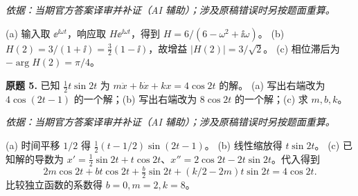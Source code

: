 \begin{solution}
\textit{依据：当期官方答案译审并补证（AI 辅助）；涉及原稿错误时另按题面重算。}\par
(a) 输入取 $\ee^{\ii\omega t}$，响应取 $H\ee^{\ii\omega t}$，得到 $H=6/(6-\omega^2+\ii\omega)$。
(b) $H(2)=3/(1+\ii)=\tfrac32(1-\ii)$，故增益 $|H(2)|=3/\sqrt2$。
(c) 相位滞后为 $-\arg H(2)=\pi/4$。
\end{solution}
\begin{exercise}\label{cw:ex2-5}\textbf{原题 5.} 已知 $\tfrac12t\sin2t$ 为 $m\ddot x+b\dot x+kx=4\cos2t$ 的解。
(a) 写出右端改为 $4\cos(2t-1)$ 的一个解；(b) 写出右端改为 $8\cos2t$ 的一个解；(c) 求 $m,b,k$。
\end{exercise}
\begin{solution}
\textit{依据：当期官方答案译审并补证（AI 辅助）；涉及原稿错误时另按题面重算。}\par
(a) 时间平移 $1/2$ 得 $\tfrac12(t-1/2)\sin(2t-1)$。
(b) 线性缩放得 $t\sin2t$。
(c) 已知解的导数为 $x'=\tfrac12\sin2t+t\cos2t$、$x''=2\cos2t-2t\sin2t$。代入得到
\[2m\cos2t+bt\cos2t+\tfrac b2\sin2t+(k/2-2m)t\sin2t=4\cos2t.\]
比较独立函数的系数得 $b=0,m=2,k=8$。
\end{solution}

